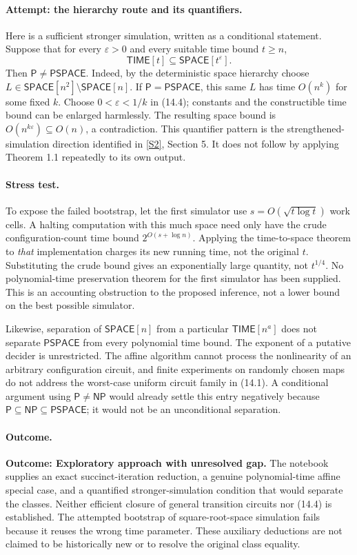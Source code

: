 \documentclass[11pt,a4paper]{article}
\newcommand{\sref}[2]{\hyperlink{source:#1:#2}{[S#2]}}
\begin{document}
\paragraph{Attempt: the hierarchy route and its quantifiers.}
Here is a sufficient stronger simulation, written as a conditional
statement. Suppose that for every $\varepsilon>0$ and every suitable
time bound $t\geq n$,
\[
 \mathsf{TIME}[t]\subseteq\mathsf{SPACE}[t^{\varepsilon}]. \tag{14.4}
\]
Then $\mathsf P\ne\mathsf{PSPACE}$. Indeed, by the deterministic space
hierarchy choose
$L\in\mathsf{SPACE}[n^2]\setminus\mathsf{SPACE}[n]$.
If $\mathsf P=\mathsf{PSPACE}$, this same $L$ has time $O(n^k)$ for some
fixed $k$. Choose $0<\varepsilon<1/k$ in (14.4); constants and the
constructible time bound can be enlarged harmlessly. The resulting
space bound is $O(n^{k\varepsilon})\subseteq O(n)$, a contradiction.
This quantifier pattern is the strengthened-simulation direction
identified in \sref{statement}{2}, Section 5. It does not follow by applying
Theorem 1.1 repeatedly to its own output.

\paragraph{Stress test.}
To expose the failed bootstrap, let the first simulator use
$s=O(\sqrt{t\log t})$ work cells. A halting computation with this much
space need only have the crude configuration-count time bound
$2^{O(s+\log n)}$. Applying the time-to-space theorem to \emph{that}
implementation charges its new running time, not the original $t$.
Substituting the crude bound gives an exponentially large quantity, not
$t^{1/4}$. No polynomial-time preservation theorem for the first
simulator has been supplied. This is an accounting obstruction to the
proposed inference, not a lower bound on the best possible simulator.

Likewise, separation of $\mathsf{SPACE}[n]$ from a particular
$\mathsf{TIME}[n^a]$ does not separate $\mathsf{PSPACE}$ from every
polynomial time bound. The exponent of a putative decider is unrestricted.
The affine algorithm cannot process the nonlinearity of an arbitrary
configuration circuit, and finite experiments on randomly chosen maps
do not address the worst-case uniform circuit family in (14.1).
A conditional argument using $\mathsf P\ne\mathsf{NP}$ would already
settle this entry negatively because
$\mathsf P\subseteq\mathsf{NP}\subseteq\mathsf{PSPACE}$; it would not
be an unconditional separation.

\paragraph{Outcome.}
\textbf{Outcome: Exploratory approach with unresolved gap.}
The notebook supplies an exact succinct-iteration reduction, a genuine
polynomial-time affine special case, and a quantified stronger-simulation
condition that would separate the classes. Neither efficient closure of
general transition circuits nor (14.4) is established. The attempted
bootstrap of square-root-space simulation fails because it reuses the
wrong time parameter. These auxiliary deductions are not claimed to be
historically new or to resolve the original class equality.
\end{document}

